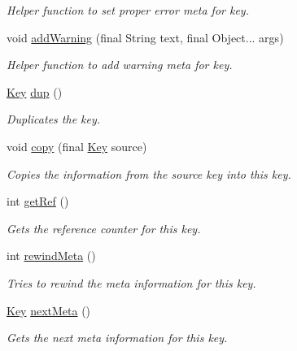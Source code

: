 \begin{DoxyCompactItemize}
\begin{DoxyCompactList}\small\item\em Helper function to set proper error meta for key. \end{DoxyCompactList}\item 
void \mbox{\hyperlink{classorg_1_1libelektra_1_1Key_a542a69d75c304dda3f78cb3b185022ee}{add\+Warning}} (final String text, final Object... args)
\begin{DoxyCompactList}\small\item\em Helper function to add warning meta for key. \end{DoxyCompactList}\item 
\mbox{\hyperlink{classorg_1_1libelektra_1_1Key}{Key}} \mbox{\hyperlink{classorg_1_1libelektra_1_1Key_a67a839951aa9bc48f8ffbb1ebcdfb819}{dup}} ()
\begin{DoxyCompactList}\small\item\em Duplicates the key. \end{DoxyCompactList}\item 
void \mbox{\hyperlink{classorg_1_1libelektra_1_1Key_abe0bb2790e29c52c12fec86a73818626}{copy}} (final \mbox{\hyperlink{classorg_1_1libelektra_1_1Key}{Key}} source)
\begin{DoxyCompactList}\small\item\em Copies the information from the source key into this key. \end{DoxyCompactList}\item 
int \mbox{\hyperlink{classorg_1_1libelektra_1_1Key_a3672b9c763ac97d78317b3d54a370107}{get\+Ref}} ()
\begin{DoxyCompactList}\small\item\em Gets the reference counter for this key. \end{DoxyCompactList}\item 
int \mbox{\hyperlink{classorg_1_1libelektra_1_1Key_aea5c4a3a24237dca57e55beca85db0be}{rewind\+Meta}} ()
\begin{DoxyCompactList}\small\item\em Tries to rewind the meta information for this key. \end{DoxyCompactList}\item 
\mbox{\hyperlink{classorg_1_1libelektra_1_1Key}{Key}} \mbox{\hyperlink{classorg_1_1libelektra_1_1Key_ace2853c3ca003e9099272871a6d61ad6}{next\+Meta}} ()
\begin{DoxyCompactList}\small\item\em Gets the next meta information for this key. \end{DoxyCompactList}\item 

\end{DoxyCompactItemize}
